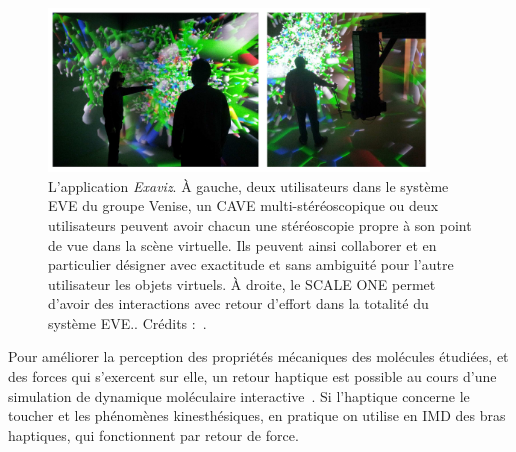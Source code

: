 	\begin{figure}[!htbp]
		\centering
		\includegraphics[width=0.9\textwidth]{figures/ch1/exaviz}
		\caption[IMD en environnement virtuel avec retour haptique, \emph{Exaviz}]{L'application \emph{Exaviz}. À gauche, deux utilisateurs dans le système EVE\footnotemark{} du groupe Venise, un CAVE multi-stéréoscopique ou deux utilisateurs peuvent avoir chacun une stéréoscopie propre à son point de vue dans la scène virtuelle. Ils peuvent ainsi collaborer et en particulier désigner avec exactitude et sans ambiguité pour l'autre utilisateur les objets virtuels. À droite, le SCALE ONE permet d'avoir des interactions avec retour d'effort dans la totalité du système EVE.. Crédits :~\cite{dreher2014exaviz, cazauxsysteme}.}
		\label{fig:exaviz}
	\end{figure}
	
	
	Pour améliorer la perception des propriétés mécaniques des molécules étudiées, et des forces qui s'exercent sur elle, un retour haptique est possible au cours d'une simulation de dynamique moléculaire interactive~\cite{stone2001system}. Si l'haptique concerne le toucher et les phénomènes kinesthésiques, en pratique on utilise en IMD des bras haptiques, qui fonctionnent par retour de force.
	
